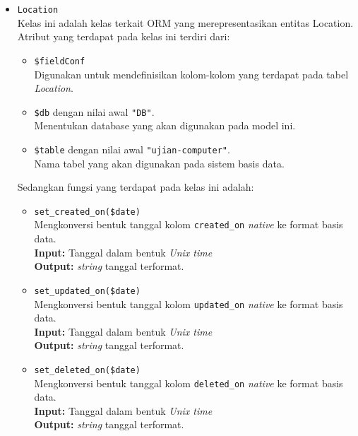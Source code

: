 \begin{itemize}
        \item \texttt{Location} \\
            Kelas ini adalah kelas terkait ORM yang merepresentasikan entitas Location. Atribut yang 
            terdapat pada kelas ini terdiri dari:
            \begin{itemize}
                \item \texttt{\$fieldConf} \\
                    Digunakan untuk mendefinisikan kolom-kolom yang terdapat pada tabel \textit{Location}.
                \item \texttt{\$db} dengan nilai awal \texttt{"DB"}. \\
                    Menentukan database yang akan digunakan pada model ini.
                \item \texttt{\$table} dengan nilai awal \texttt{"ujian-computer"}. \\
                    Nama tabel yang akan digunakan pada sistem basis data. 
            \end{itemize}
            Sedangkan fungsi yang terdapat pada kelas ini adalah:
            \begin{itemize}
                \item \texttt{set\_created\_on(\$date)} \\
                    Mengkonversi bentuk tanggal kolom \texttt{created\_on} \textit{native} ke 
                    format basis data. \\
                    \textbf{Input:} Tanggal dalam bentuk \textit{Unix time}\\
                    \textbf{Output:} \textit{string} tanggal terformat.
                
                \item \texttt{set\_updated\_on(\$date)} \\
                    Mengkonversi bentuk tanggal kolom \texttt{updated\_on} \textit{native} ke 
                    format basis data. \\
                    \textbf{Input:} Tanggal dalam bentuk \textit{Unix time}\\
                    \textbf{Output:} \textit{string} tanggal terformat.
                    
                \item \texttt{set\_deleted\_on(\$date)} \\
                    Mengkonversi bentuk tanggal kolom \texttt{deleted\_on} \textit{native} ke 
                    format basis data. \\
                    \textbf{Input:} Tanggal dalam bentuk \textit{Unix time}\\
                    \textbf{Output:} \textit{string} tanggal terformat.
                    

\end{itemize}
\end{itemize}
